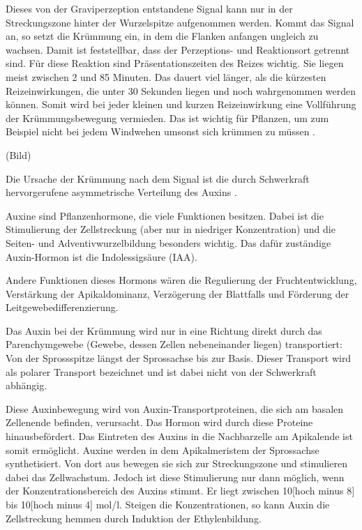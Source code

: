\documentclass[
a4paper, 
11pt, 
ngerman,
listof=totoc,
bibliography=totocnumbered,
abstracton
]{scrreprt}
\begin{document}
Dieses von der Graviperzeption entstandene Signal kann nur in der Streckungszone hinter der Wurzelspitze aufgenommen werden. Kommt das Signal an, so setzt die Krümmung ein, in dem die Flanken anfangen ungleich zu wachsen. Damit ist feststellbar, dass der Perzeptions- und Reaktionsort getrennt sind.
Für diese Reaktion sind Präsentationszeiten des Reizes wichtig. Sie liegen meist zwischen 2 und 85 Minuten. Das dauert viel länger, als die kürzesten Reizeinwirkungen, die unter 30 Sekunden liegen und noch wahrgenommen werden können.
Somit wird bei jeder kleinen und kurzen Reizeinwirkung eine Vollführung der Krümmungsbewegung vermieden. Das ist wichtig für Pflanzen, um zum Beispiel nicht bei jedem Windwehen umsonst sich krümmen zu müssen \parencite[531]{Luettge}.

(Bild)

Die Ursache der Krümmung nach dem Signal ist die durch Schwerkraft hervorgerufene asymmetrische Verteilung des Auxins  \parencite[502f]{Nultsch}.

Auxine sind Pflanzenhormone, die viele Funktionen besitzen. Dabei ist die Stimulierung der Zellstreckung (aber nur in niedriger Konzentration) und die Seiten- und Adventivwurzelbildung besonders wichtig. Das dafür zuständige Auxin-Hormon ist die Indolessigsäure (IAA).

Andere Funktionen dieses Hormons wären die Regulierung der Fruchtentwicklung, Verstärkung der Apikaldominanz, Verzögerung der Blattfalls und Förderung der Leitgewebedifferenzierung.

Das Auxin bei der Krümmung wird nur in eine Richtung direkt durch das Parenchymgewebe (Gewebe, dessen Zellen nebeneinander liegen) transportiert: Von der Sprossspitze längst der Sprossachse bis zur Basis. Dieser Transport wird als polarer Transport bezeichnet und ist dabei nicht von der Schwerkraft abhängig.

Diese Auxinbewegung wird von Auxin-Transportproteinen, die sich am basalen Zellenende befinden, verursacht.
Das Hormon wird durch diese Proteine hinausbefördert. Das Eintreten des Auxins in die Nachbarzelle am Apikalende ist somit ermöglicht.
Auxine werden in dem Apikalmeristem der Sprossachse synthetisiert. Von dort aus bewegen sie sich zur Streckungszone und stimulieren dabei das Zellwachstum.
Jedoch ist diese Stimulierung nur dann möglich, wenn der Konzentrationsbereich des Auxins stimmt. Er liegt zwischen 10[hoch minus 8] bis 10[hoch minus 4] mol/l. Steigen die Konzentrationen, so kann Auxin die Zellstreckung hemmen durch Induktion der Ethylenbildung.
\end{document}
